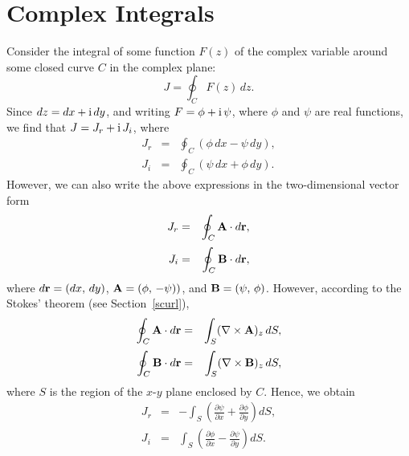 \section{Complex Integrals}\label{scauchy}
Consider the integral of some function $F(z)$ of the complex variable around some closed curve $C$ in the complex
plane:
\begin{equation}
J = \oint_C F(z)\,dz.
\end{equation}
Since $dz=dx+{\rm i}\,dy$, and writing $F=\phi+{\rm i}\,\psi$, where $\phi$ and $\psi$ are real functions, 
we find that $J=J_r+{\rm i}\,J_i$, where
\begin{eqnarray}
J_r&=&\oint_C (\phi\,dx-\psi\,dy),\\[0.5ex]
J_i&=&\oint_C (\psi\,dx+\phi\,dy).
\end{eqnarray}
However, we can also write the above expressions in the two-dimensional vector form
\begin{eqnarray}
J_r &=&\oint_C {\bf A}\cdot d{\bf r},\\[0.5ex]
J_i &=&\oint_C {\bf B}\cdot d{\bf r},
\end{eqnarray}
where $d{\bf r}=(dx,\,dy)$, ${\bf A}=(\phi,\,-\psi))$, and ${\bf B} = (\psi,\,\phi)$. However, according to
the Stokes' theorem (see Section~\ref{scurl}), 
\begin{eqnarray}
\oint_C {\bf A}\cdot d{\bf r}&=&\int_S (\nabla\times {\bf A})_z\,dS,\\[0.5ex]
\oint_C {\bf B}\cdot d{\bf r} &=&\int_S (\nabla\times {\bf B})_z\,dS,
\end{eqnarray}
where $S$ is the region of the $x$-$y$ plane enclosed by $C$. Hence, we obtain
\begin{eqnarray}
J_r &=&-\int_S\left(\frac{\partial\psi}{\partial x} + \frac{\partial\phi}{\partial y}\right)dS,\\[0.5ex]
J_i&=&\int_S\left(\frac{\partial\phi}{\partial x} - \frac{\partial\psi}{\partial y}\right)dS.
\end{eqnarray}

